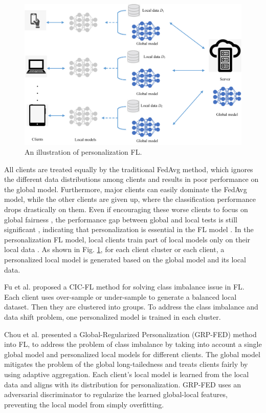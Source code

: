 \documentclass[10pt,journal,compsoc]{IEEEtran}
\begin{document}
	\begin{figure}[h]
		\centering
		\includegraphics[scale=0.5]{personality.png}
		\caption{An illustration of personalization FL.}
		\label{personalization}
	\end{figure}
	
	All clients are treated equally by the traditional FedAvg method, which ignores the different data distributions among clients and results in poor performance on the global model. Furthermore, major clients can easily dominate the FedAvg model, while the other clients are given up, where the classification performance drops drastically on them. Even if encouraging these worse clients to focus on global fairness \cite{mohri2019agnostic} \cite{li2019fair}, the performance gap between global and local tests is still significant \cite{jiang2019improving}, indicating that personalization is essential in the FL model \cite{chou2022grp}. In the personalization FL model, local clients train part of local models only on their local data \cite{fallah2020personalized} \cite{khodak2019adaptive} \cite{liang2020think}. As shown in Fig. \ref{personalization}, for each client cluster or each client, a personalized local model is generated based on the global model and its local data.
	
	Fu et al. \cite{fu2021cic} proposed a CIC-FL method for solving class imbalance issue in FL. Each client uses over-sample or under-sample to generate a balanced local dataset. Then they are clustered into groups. To address the class imbalance and data shift problem, one personalized model is trained in each cluster. 
	
	Chou et al. \cite{chou2022grp} presented a Global-Regularized Personalization (GRP-FED) method into FL, to address the problem of class imbalance by taking into account a single global model and personalized local models for different clients. The global model mitigates the problem of the global long-tailedness and treats clients fairly by using adaptive aggregation. Each client's local model is learned from the local data and aligns with its distribution for personalization. GRP-FED uses an adversarial discriminator to regularize the learned global-local features, preventing the local model from simply overfitting. 
	
\end{document}
